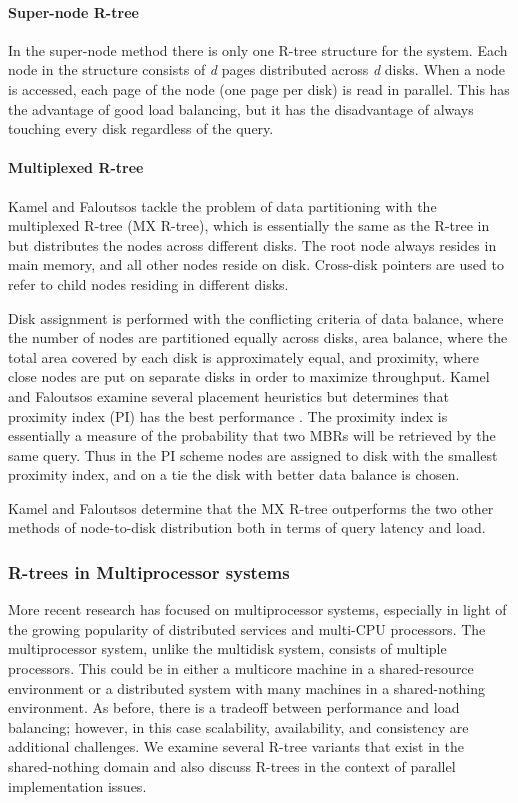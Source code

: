 \paragraph{Super-node R-tree}
In the super-node method \cite{kamel1992parallel,thebook} there is only
one R-tree structure for the system. Each node in the structure consists of
\emph{d} pages distributed across \emph{d} disks. When a node is accessed, each
page of the node (one page per disk) is read in parallel. This has the 
advantage of good load balancing, but it has the disadvantage of
always touching every disk regardless of the query.

\paragraph{Multiplexed R-tree}
Kamel and Faloutsos tackle the problem of data partitioning with the 
multiplexed R-tree (MX R-tree)\cite{kamel1992parallel}, which is 
essentially the same as the R-tree in \cite{guttman84} but distributes the 
nodes across different disks. The root node always resides in main memory, 
and all other nodes reside on disk. Cross-disk pointers are used to refer 
to child nodes residing in different disks. 

Disk assignment is performed with the conflicting criteria of
data balance, where the number of nodes are partitioned equally across disks, 
area balance, where the total area covered by each disk is approximately 
equal, and proximity, where close nodes are put on separate disks in order to
maximize throughput. Kamel and Faloutsos examine several placement 
heuristics but determines that proximity index (PI) has the best performance 
\cite{kamel1992parallel}. The proximity index is essentially a measure of the 
probability that two MBRs
will be retrieved by the same query. Thus in the PI scheme nodes are assigned 
to disk with the smallest proximity index, and on a tie the disk with better 
data balance is chosen.

Kamel and Faloutsos determine that the MX R-tree outperforms the two other 
methods of node-to-disk distribution both in terms of query latency and load.
 
\subsubsection{R-trees in Multiprocessor systems}
More recent research has focused on multiprocessor systems, especially in 
light of the growing popularity of distributed services and multi-CPU processors.
The multiprocessor system, unlike the multidisk system, consists of multiple 
processors. This could be in either a multicore machine in a shared-resource
environment or a distributed system with many machines in a shared-nothing 
environment. As before, there is a tradeoff between performance and load 
balancing; however, in this case scalability, availability, and consistency
are additional challenges. We examine several R-tree variants that exist in
the shared-nothing domain and also discuss R-trees in the context of parallel 
implementation issues.

